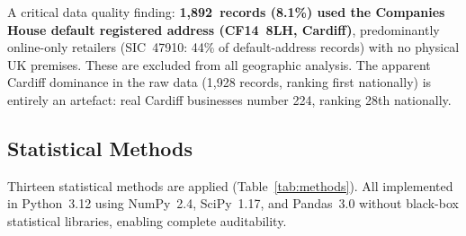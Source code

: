 \documentclass[12pt,a4paper]{article}
\begin{document}
A critical data quality finding: \textbf{1,892~records (8.1\%) used the Companies House
default registered address (CF14~8LH, Cardiff)}, predominantly online-only retailers
(SIC~47910: 44\% of default-address records) with no physical UK premises. These are
excluded from all geographic analysis. The apparent Cardiff dominance in the raw data
(1,928 records, ranking first nationally) is entirely an artefact: real Cardiff businesses
number 224, ranking 28th nationally.

\subsection{Statistical Methods}

Thirteen statistical methods are applied (Table~\ref{tab:methods}). All implemented in
Python~3.12 using NumPy~2.4, SciPy~1.17, and Pandas~3.0 without black-box statistical
libraries, enabling complete auditability.
\end{document}
